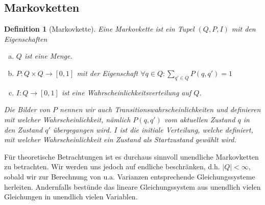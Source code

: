 \documentclass[a4paper]{article}
\newtheorem{definition}[satz]{Definition} %
\theoremstyle{nonumberplain}
\begin{document}
\subsection{Markovketten}

\newcommand{\mc}{Markovkette}
\newcommand{\mcex}{$M = (Q, P, I)$}
\begin{definition}[\mc]\label{def-mc}
	Eine \mc{} ist ein Tupel $(Q, P, I)$ mit den Eigenschaften
	\begin{enumerate}[(a)]
		\item $Q$ ist eine Menge.
		\item $P : Q \times Q \to [0,1]$ mit der Eigenschaft $\forall q \in Q : \sum_{q' \in Q}{P(q,q') = 1}$
		\item $I : Q \to [0,1]$ ist eine Wahrscheinlichkeitsverteilung auf $Q$.
	\end{enumerate}	
	Die Bilder von $P$ nennen wir auch Transitionswahrscheinlichkeiten und definieren mit welcher Wahrscheinlichkeit, nämlich $P(q,q')$ vom aktuellen Zustand $q$ in den Zustand $q'$ übergegangen wird. $I$ ist die initiale Verteilung, welche definiert, mit welcher Wahrscheinlichkeit ein Zustand als Startzustand gewählt wird.
\end{definition}

Für theoretische Betrachtungen ist es durchaus sinnvoll unendliche \mc{}n zu betrachten. Wir werden uns jedoch auf endliche beschränken, d.h. $|Q| < \infty$, sobald wir zur Berechnung von u.a. Varianzen entsprechende Gleichungssysteme herleiten. Andernfalls bestünde das lineare Gleichungssystem aus unendlich vielen Gleichungen in unendlich vielen Variablen.
\end{document}
